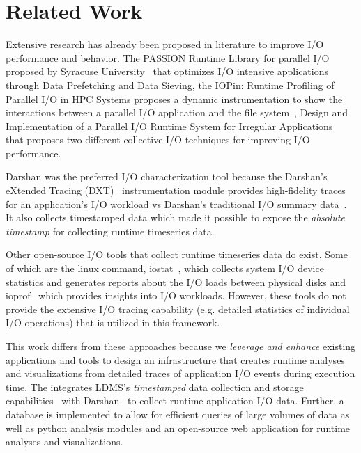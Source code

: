 \section{Related Work}
\label{sec:rw}
Extensive research has already been proposed in literature to improve I/O performance and behavior. The PASSION Runtime Library for parallel I/O proposed by Syracuse University~\cite{RuntimeLibrary-ParallelI/O} that optimizes I/O intensive applications through Data Prefetching and Data Sieving, the IOPin: Runtime Profiling of Parallel I/O in HPC
Systems proposes a dynamic instrumentation to show the interactions between a parallel I/O application and the file system~\cite{HPC-IO-Runtime}, Design and Implementation of a Parallel I/O Runtime System for Irregular Applications~\cite{RuntimeLibrary-IrregularApps} that proposes two different collective I/O techniques for improving I/O performance. 

Darshan was the preferred I/O characterization tool because the Darshan's eXtended Tracing (DXT)~\cite{darshan-runtime} instrumentation module provides high-fidelity traces for an application's I/O workload vs Darshan's traditional I/O summary data~\cite{darshan-runtime}. It also collects timestamped data which made it possible to expose the \emph{absolute timestamp} for collecting runtime timeseries data. 

Other open-source I/O tools that collect runtime timeseries data do exist. Some of which are the linux command, iostat~\cite{iostat}, which collects system I/O device statistics and generates reports about the I/O loads between physical disks and ioprof~\cite{ioprof} which provides insights into I/O workloads. However, these tools do not provide the extensive I/O tracing capability (e.g. detailed statistics of individual I/O operations) that is utilized in this framework. 

This work differs from these approaches because we \emph{leverage and enhance} existing applications and tools to design an infrastructure that creates runtime analyses and visualizations from detailed traces of application I/O events during execution time. The \Darshan{} integrates LDMS's \emph{timestamped} data collection and storage capabilities~\cite{ldmsgithub} with Darshan~\cite{darshan-webpage} to collect runtime application I/O data. Further, a database is implemented to allow for efficient queries of large volumes of data as well as python analysis modules and an open-source web application for runtime analyses and visualizations.

